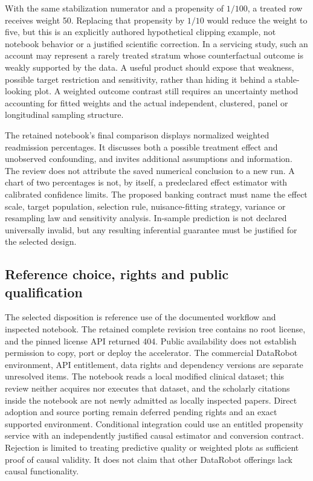With the same stabilization numerator and a propensity of $1/100$, a treated
row receives weight 50. Replacing that propensity by $1/10$ would reduce the
weight to five, but this is an explicitly authored hypothetical clipping
example, not notebook behavior or a justified scientific correction. In a
servicing study, such an account may represent a rarely treated stratum whose
counterfactual outcome is weakly supported by the data. A useful product
should expose that weakness, possible target restriction and sensitivity,
rather than hiding it behind a stable-looking plot. A weighted outcome contrast
still requires an uncertainty method accounting for fitted weights and the
actual independent, clustered, panel or longitudinal sampling structure.
\citep{exec25_datarobot_choice}

The retained notebook's final comparison displays normalized weighted
readmission percentages. It discusses both a possible treatment effect and
unobserved confounding, and invites additional assumptions and information.
The review does not attribute the saved numerical conclusion to a new run.
A chart of two percentages is not, by itself, a predeclared effect estimator
with calibrated confidence limits. The proposed banking contract must name
the effect scale, target population, selection rule, nuisance-fitting strategy,
variance or resampling law and sensitivity analysis. In-sample prediction is
not declared universally invalid, but any resulting inferential guarantee must
be justified for the selected design.\citep{exec25_datarobot_notebook,exec25_datarobot_choice}

\subsection{Reference choice, rights and public qualification}
The selected disposition is reference use of the documented workflow and
inspected notebook. The retained complete revision tree contains no root
license, and the pinned license API returned 404. Public availability does
not establish permission to copy, port or deploy the accelerator. The
commercial DataRobot environment, API entitlement, data rights and dependency
versions are separate unresolved items. The notebook reads a local modified
clinical dataset; this review neither acquires nor executes that dataset, and
the scholarly citations inside the notebook are not newly admitted as locally
inspected papers. Direct adoption and source porting remain deferred pending
rights and an exact supported environment. Conditional integration could use
an entitled propensity service with an independently justified causal
estimator and conversion contract. Rejection is limited to treating predictive
quality or weighted plots as sufficient proof of causal validity. It does not
claim that other DataRobot offerings lack causal functionality.
\citep{exec13_ch_datarobot,exec25_datarobot_notebook,exec25_datarobot_choice}

